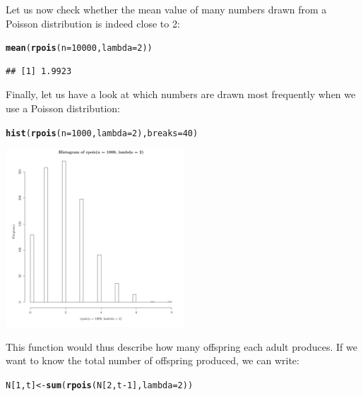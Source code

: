 \documentclass{article}\usepackage[]{graphicx}\usepackage[]{color}
\makeatletter
\newcommand{\hlnum}[1]{\textcolor[rgb]{0.686,0.059,0.569}{#1}}%
\newcommand{\hlopt}[1]{\textcolor[rgb]{0,0,0}{#1}}%
\newcommand{\hlstd}[1]{\textcolor[rgb]{0.345,0.345,0.345}{#1}}%
\newcommand{\hlkwb}[1]{\textcolor[rgb]{0.69,0.353,0.396}{#1}}%
\newcommand{\hlkwc}[1]{\textcolor[rgb]{0.333,0.667,0.333}{#1}}%
\newcommand{\hlkwd}[1]{\textcolor[rgb]{0.737,0.353,0.396}{\textbf{#1}}}%
\newenvironment{kframe}{%
 \def\at@end@of@kframe{}%
 \ifinner\ifhmode%
  \def\at@end@of@kframe{\end{minipage}}%
  \begin{minipage}{\columnwidth}%
 \fi\fi%
 \def\FrameCommand##1{\hskip\@totalleftmargin \hskip-\fboxsep
 \colorbox{shadecolor}{##1}\hskip-\fboxsep
     \hskip-\linewidth \hskip-\@totalleftmargin \hskip\columnwidth}%
 \MakeFramed {\advance\hsize-\width
   \@totalleftmargin\z@ \linewidth\hsize
   \@setminipage}}%
 {\par\unskip\endMakeFramed%
 \at@end@of@kframe}
\newenvironment{knitrout}{}{} %
\makeatother
\begin{document}
Let us now check whether the mean value of many numbers drawn from a Poisson distribution is indeed close to 2:
\begin{knitrout}
\color{fgcolor}\begin{kframe}
\begin{alltt}
\hlkwd{mean}\hlstd{(}\hlkwd{rpois}\hlstd{(}\hlkwc{n}\hlstd{=}\hlnum{10000}\hlstd{,}\hlkwc{lambda}\hlstd{=}\hlnum{2}\hlstd{))}
\end{alltt}
\begin{verbatim}
## [1] 1.9923
\end{verbatim}
\end{kframe}
\end{knitrout}
Finally, let us have a look at which numbers are drawn most frequently when we use a Poisson distribution:
\begin{knitrout}
\color{fgcolor}\begin{kframe}
\begin{alltt}
\hlkwd{hist}\hlstd{(}\hlkwd{rpois}\hlstd{(}\hlkwc{n}\hlstd{=}\hlnum{1000}\hlstd{,}\hlkwc{lambda}\hlstd{=}\hlnum{2}\hlstd{),}\hlkwc{breaks}\hlstd{=}\hlnum{40}\hlstd{)}
\end{alltt}
\end{kframe}

{\centering \includegraphics[width=0.5\textwidth]{figure/dice7-1} 

}



\end{knitrout}
This function would thus describe how many offspring each adult produces. If we want to know the total number of offspring produced, we can write:
\begin{knitrout}
\color{fgcolor}\begin{kframe}
\begin{alltt}
\hlstd{N[}\hlnum{1}\hlstd{,t]}\hlkwb{<-}\hlkwd{sum}\hlstd{(}\hlkwd{rpois}\hlstd{(N[}\hlnum{2}\hlstd{,t}\hlopt{-}\hlnum{1}\hlstd{],}\hlkwc{lambda}\hlstd{=}\hlnum{2}\hlstd{))}
\end{alltt}
\end{kframe}
\end{knitrout}
\end{document}
